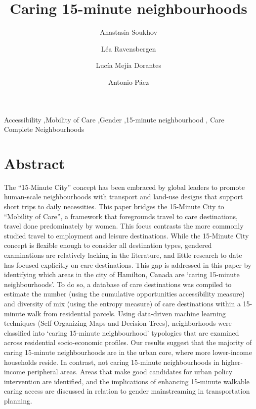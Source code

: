 \documentclass[
  authoryear,
  preprint,
  3p]{elsarticle}
\begin{document}
\begin{frontmatter}
\title{Caring 15-minute neighbourhoods}
\author[1]{Anastasia Soukhov%
%
}
\author[1]{Léa Ravensbergen%
%
}
\author[2]{Lucía Mejía Dorantes%
%
}
\author[1]{Antonio Páez%
%
}






        





\begin{keyword}
    Accessibility \sep Mobility of Care \sep Gender \sep 15-minute
neighbourhood \sep 
    Care Complete Neighbourhoods
\end{keyword}
\end{frontmatter}
    
\section{Abstract}\label{abstract}

The ``15-Minute City'' concept has been embraced by global leaders to
promote human-scale neighbourhoods with transport and land-use designs
that support short trips to daily necessities. This paper bridges the
15-Minute City to ``Mobility of Care'', a framework that foregrounds
travel to care destinations, travel done predominately by women. This
focus contrasts the more commonly studied travel to employment and
leisure destinations. While the 15-Minute City concept is flexible
enough to consider all destination types, gendered examinations are
relatively lacking in the literature, and little research to date has
focused explicitly on care destinations. This gap is addressed in this
paper by identifying which areas in the city of Hamilton, Canada are
`caring 15-minute neighbourhoods'. To do so, a database of care
destinations was compiled to estimate the number (using the cumulative
opportunities accessibility measure) and diversity of mix (using the
entropy measure) of care destinations within a 15-minute walk from
residential parcels. Using data-driven machine learning techniques
(Self-Organizing Maps and Decision Trees), neighborhoods were classified
into `caring 15-minute neighbourhood' typologies that are examined
across residential socio-economic profiles. Our results suggest that the
majority of caring 15-minute neighbourhoods are in the urban core, where
more lower-income households reside. In contrast, not caring 15-minute
neighbourhoods in higher-income peripheral areas. Areas that make good
candidates for urban policy intervention are identified, and the
implications of enhancing 15-minute walkable caring access are discussed
in relation to gender mainstreaming in transportation planning.
\end{document}
